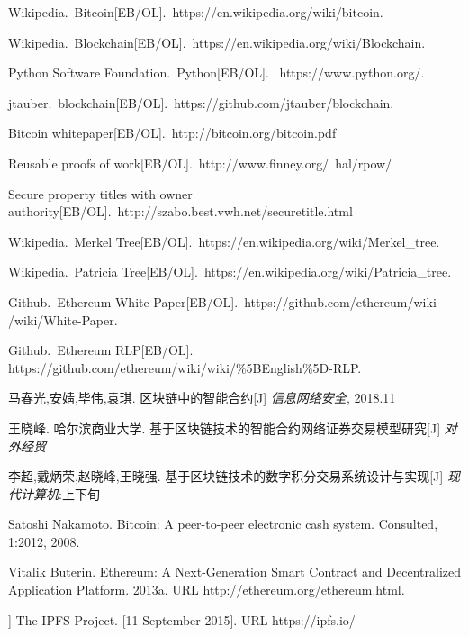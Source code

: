 \documentclass[a4paper,12pt,titlepage]{ctexart}
\begin{document}
\begin{thebibliography}{99}
	 Wikipedia.~Bitcoin[EB/OL].~\mbox{https://en.wikipedia.org/wiki/bitcoin.}
	
	 Wikipedia.~Blockchain[EB/OL].~\mbox{https://en.wikipedia.org/wiki/Blockchain.}
	
	 Python Software Foundation.~Python[EB/OL]. ~\mbox{https://www.python.org/.}
	
	 jtauber.~blockchain[EB/OL].~\mbox{https://github.com/jtauber/blockchain.}
	
	 Bitcoin whitepaper[EB/OL].~\mbox{http://bitcoin.org/bitcoin.pdf}
	
	 Reusable proofs of work[EB/OL].~\mbox{http://www.finney.org/~hal/rpow/}
	
	 Secure property titles with owner authority[EB/OL].~\mbox{http://szabo.best.vwh.net/securetitle.html}
	
	 Wikipedia.~Merkel Tree[EB/OL].~\mbox{https://en.wikipedia.org/wiki/Merkel\_tree.}
	
	 Wikipedia.~Patricia Tree[EB/OL].~\mbox{https://en.wikipedia.org/wiki/Patricia\_tree.}
	
	 Github.~Ethereum White Paper[EB/OL].~https://github.com/ethereum/wiki \\ /wiki/White-Paper.
	
	 Github.~Ethereum RLP[EB/OL].\\\mbox{https://github.com/ethereum/wiki/wiki/\%5BEnglish\%5D-RLP.}
	
	 马春光,安婧,毕伟,袁琪. 区块链中的智能合约[J] \emph{信息网络安全}, 2018.11
	
	 王晓峰. 哈尔滨商业大学. 基于区块链技术的智能合约网络证券交易模型研究[J] \emph{对外经贸}
	
	 李超,戴炳荣,赵晓峰,王晓强. 基于区块链技术的数字积分交易系统设计与实现[J] \emph{现代计算机}:上下旬
	
	 Satoshi Nakamoto.  Bitcoin: A peer-to-peer electronic cash system. Consulted, 1:2012, 2008.
	
	 Vitalik Buterin. Ethereum: A Next-Generation Smart Contract and Decentralized Application Platform. 2013a. URL {http://ethereum.org/ethereum.html}.
	
	]  The IPFS Project. [11 September 2015]. URL{ https://ipfs.io/}

\end{thebibliography}
\end{document}
